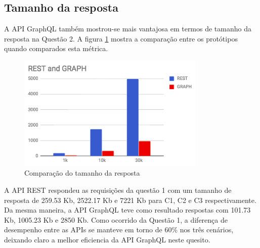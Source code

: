 \subsection{Tamanho da resposta}

A API GraphQL também mostrou-se mais vantajosa em termos de tamanho da resposta na Questão 2. A figura \ref{fig:q2-size} mostra a comparação entre os protótipos quando comparados esta métrica.

\begin{figure}[htbp]
    \centering
    \includegraphics[width=0.8\textwidth]{figuras/Q1-size.png}
    \caption{Comparação do tamanho da resposta}
    \label{fig:q2-size}
    \author{fonte: Autor}
\end{figure}

A API REST respondeu as requisições da questão 1 com um tamanho de resposta de 259.53 Kb, 2522.17 Kb e 7221 Kb para C1, C2 e C3 respectivamente. Da mesma maneira, a API GraphQL teve como resultado respostas com 101.73 Kb, 1005.23 Kb e 2850 Kb. Como ocorrido da Questão 1, a diferença de desempenho entre as APIs se manteve em torno de 60\% nos três cenários, deixando claro a melhor eficiencia da API GraphQL neste quesito.